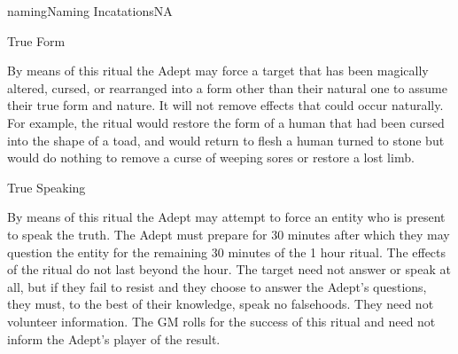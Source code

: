 \begin{College}[2.0]{naming}{Naming Incatations}{NA}
\begin{ritual}[R-6]{True Form}
\begin{effects}
By means of this ritual the Adept may force a target that has been
magically altered, cursed, or rearranged into a form other than their
natural one to assume their true form and nature. It will not remove
effects that could occur naturally.  For example, the ritual would
restore the form of a human that had been cursed into the shape of a
toad, and would return to flesh a human turned to stone but would do
nothing to remove a curse of weeping sores or restore a lost limb.
\end{effects}
\end{ritual}

\begin{ritual}[R-7]{True Speaking}

\begin{effects}
By means of this ritual the Adept may attempt to force an entity who
is present to speak the truth.  The Adept must prepare for 30 minutes
after which they may question the entity for the remaining 30 minutes
of the 1 hour ritual.  The effects of the ritual do not last beyond
the hour.  The target need not answer or speak at all, but if they
fail to resist and they choose to answer the Adept’s questions, they
must, to the best of their knowledge, speak no falsehoods.  They need
not volunteer information.  The GM rolls for the success of this
ritual and need not inform the Adept’s player of the result.
\end{effects}
\end{ritual}
\end{College}
